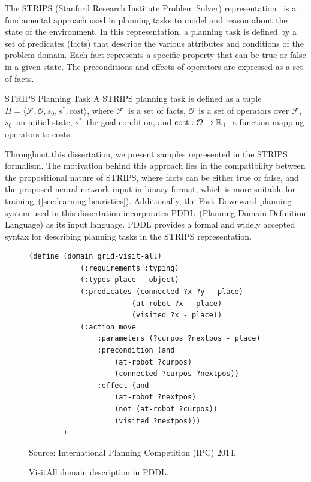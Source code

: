 The STRIPS (Stanford Research Institute Problem Solver) representation~\cite{fikes1971strips} is a fundamental approach used in planning tasks to model and reason about the state of the environment. In this representation, a planning task is defined by a set of predicates (facts) that describe the various attributes and conditions of the problem domain. Each fact represents a specific property that can be true or false in a given state. The preconditions and effects of operators are expressed as a set of facts.

\begin{definition}{STRIPS Planning Task}
    \label{def:strips}
    A STRIPS planning task is defined as a tuple~$\Pi=\langle\mathcal{F},\mathcal{O},s_0,s^*, \text{cost}\rangle$, where $\mathcal{F}$~is a set of facts, $\mathcal{O}$~is a set of operators over $\mathcal{F}$, $s_0$~an initial state, $s^*$~the goal condition, and $\text{cost}:\mathcal{O}\rightarrow\mathbb{R}_{+}$~a function mapping operators to costs.
\end{definition}

Throughout this dissertation, we present samples represented in the STRIPS formalism. The motivation behind this approach lies in the compatibility between the propositional nature of STRIPS, where facts can be either true or false, and the proposed neural network input in binary format, which is more suitable for training~(\cref{sec:learning-heuristics}). Additionally, the Fast~Downward planning system used in this dissertation incorporates PDDL~(Planning Domain Definition Language) as its input language. PDDL provides a formal and widely accepted syntax for describing planning tasks in the STRIPS representation.

\begin{figure}[ht]
    \caption{VisitAll domain description in PDDL.}
    \label{fig:pddl}
    \centering
    \begin{lstlisting}[basicstyle=\ttfamily]
        (define (domain grid-visit-all)
            (:requirements :typing)
            (:types place - object)
            (:predicates (connected ?x ?y - place)
                        (at-robot ?x - place)
                        (visited ?x - place))
            (:action move
                :parameters (?curpos ?nextpos - place)
                :precondition (and
                    (at-robot ?curpos)
                    (connected ?curpos ?nextpos))
                :effect (and 
                    (at-robot ?nextpos)
                    (not (at-robot ?curpos))
                    (visited ?nextpos)))
        )
    \end{lstlisting}
    Source: International Planning Competition (IPC) 2014.
\end{figure}

